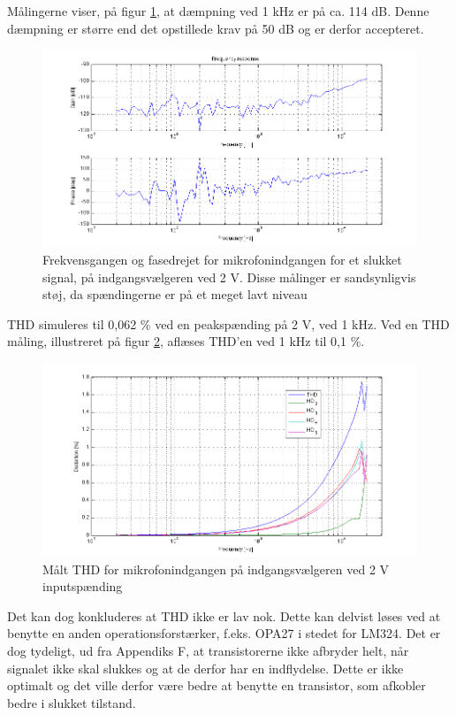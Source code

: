 Målingerne viser, på figur \ref{fig:indaccept:slukketmaaling}, at dæmpning ved 1 kHz er på ca. 114 dB. Denne dæmpning er større end det opstillede krav på 50 dB og er derfor accepteret.
\begin{figure}[h]
\centering
\includegraphics[width=\textwidth]{maalerapporter/indgangsvaelger/Indgangsvlger-mic-2v-slukket-frek.png}
\caption{Frekvensgangen og fasedrejet for mikrofonindgangen for et slukket signal, på indgangsvælgeren ved 2 V. Disse målinger er sandsynligvis støj, da spændingerne er på et meget lavt niveau}
\label{fig:indaccept:slukketmaaling}
\end{figure}	

THD simuleres til 0,062 \% ved en peakspænding på 2 V, ved 1 kHz. Ved en THD måling, illustreret på figur \ref{fig:accind:thd2v}, aflæses THD'en ved 1 kHz til 0,1 \%. 
\begin{figure}[h]
\centering
\includegraphics[width=\textwidth]{maalerapporter/indgangsvaelger/Indgangsvlger-mic-2v-thd.png}
\caption{Målt THD for mikrofonindgangen på indgangsvælgeren ved 2 V inputspænding}
\label{fig:accind:thd2v}
\end{figure}
Det kan dog konkluderes at THD ikke er lav nok. Dette kan delvist løses ved at benytte en anden operationsforstærker, f.eks. OPA27 i stedet for LM324. Det er dog tydeligt, ud fra Appendiks F, at transistorerne ikke afbryder helt, når signalet ikke skal slukkes og at de derfor har en indflydelse. Dette er ikke optimalt og det ville derfor være bedre at benytte en transistor, som afkobler bedre i slukket tilstand.

